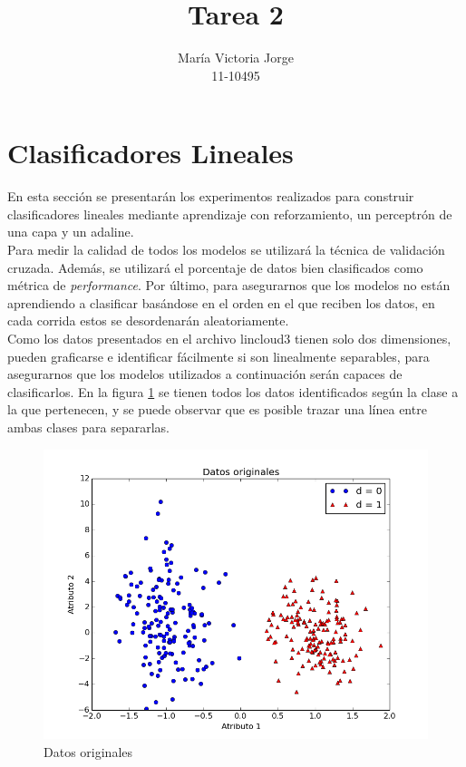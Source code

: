 \documentclass[a4paper]{article}
\title{Tarea 2}
\author{María Victoria Jorge \\ 11-10495}
\begin{document}
\maketitle

\section{Clasificadores Lineales}
	En esta sección se presentarán los experimentos realizados para construir clasificadores lineales mediante aprendizaje con reforzamiento, un perceptrón de una capa y un adaline.\\
	
	Para medir la calidad de todos los modelos se utilizará la técnica de validación cruzada. Además, se utilizará el porcentaje de datos bien clasificados como métrica de \textit{performance}. Por último, para asegurarnos que los modelos no están aprendiendo a clasificar basándose en el orden en el que reciben los datos, en cada corrida estos se desordenarán aleatoriamente.\\
	
	Como los datos presentados en el archivo lincloud3 tienen solo dos dimensiones, pueden graficarse e identificar fácilmente si
	son linealmente separables, para asegurarnos que los modelos utilizados a continuación serán capaces de clasificarlos. En la figura \ref{fig:datosOriginales} se tienen todos los datos identificados según la clase a la que pertenecen, y se puede observar que es posible trazar una línea entre ambas clases para separarlas.
	
	\begin{figure}[H]
	  \centering
	  \includegraphics[scale=0.3]{datos.png}
	  \caption{Datos originales}
	  \label{fig:datosOriginales}
	\end{figure}
	
\end{document}
